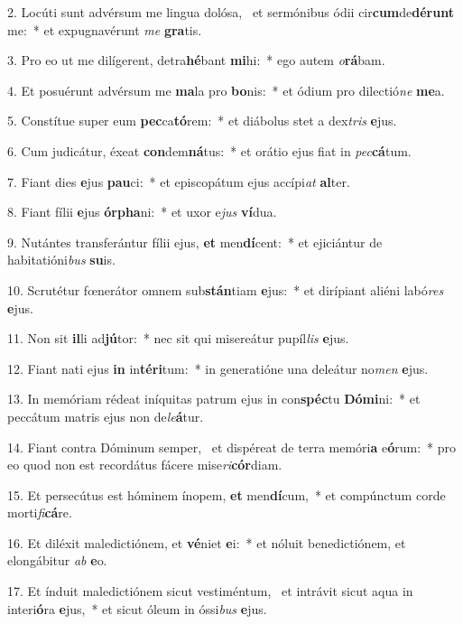 2. Locúti sunt advérsum me lingua dolósa, \dag\  et sermónibus ódii cir\textbf{cum}de\textbf{dé}\textbf{runt} me:~*  et expugnavérunt \textit{me} \textbf{gra}tis.\

3. Pro eo ut me dilígerent, detra\textbf{hé}bant \textbf{mi}hi:~*  ego autem \textit{o}\textbf{rá}bam.\

4. Et posuérunt advérsum me \textbf{ma}la pro \textbf{bo}nis:~*  et ódium pro dilectió\textit{ne} \textbf{me}a.\

5. Constítue super eum \textbf{pec}ca\textbf{tó}rem:~*  et diábolus stet a dex\textit{tris} \textbf{e}jus.\

6. Cum judicátur, éxeat \textbf{con}dem\textbf{ná}tus:~*  et orátio ejus fiat in \textit{pec}\textbf{cá}tum.\

7. Fiant dies \textbf{e}jus \textbf{pau}ci:~*  et episcopátum ejus accípi\textit{at} \textbf{al}ter.\

8. Fiant fílii \textbf{e}jus \textbf{ór}\textbf{pha}ni:~*  et uxor e\textit{jus} \textbf{ví}dua.\

9. Nutántes transferántur fílii ejus, \textbf{et} men\textbf{dí}cent:~*  et ejiciántur de habitatióni\textit{bus} \textbf{su}is.\

10. Scrutétur fœnerátor omnem sub\textbf{stán}tiam \textbf{e}jus:~*  et dirípiant aliéni labó\textit{res} \textbf{e}jus.\

11. Non sit \textbf{il}li ad\textbf{jú}tor:~*  nec sit qui misereátur pupíl\textit{lis} \textbf{e}jus.\

12. Fiant nati ejus \textbf{in} in\textbf{tér}\textbf{i}tum:~*  in generatióne una deleátur no\textit{men} \textbf{e}jus.\

13. In memóriam rédeat iníquitas patrum ejus in con\textbf{spéc}tu \textbf{Dó}\textbf{mi}ni:~*  et peccátum matris ejus non de\textit{le}\textbf{á}tur.\

14. Fiant contra Dóminum semper, \dag\  et dispéreat de terra memóri\textbf{a} e\textbf{ó}rum:~*  pro eo quod non est recordátus fácere mise\textit{ri}\textbf{cór}diam.\

15. Et persecútus est hóminem ínopem, \textbf{et} men\textbf{dí}cum,~*  et compúnctum corde morti\textit{fi}\textbf{cá}re.\

16. Et diléxit maledictiónem, et \textbf{vé}niet \textbf{e}i:~*  et nóluit benedictiónem, et elongábitur \textit{ab} \textbf{e}o.\

17. Et índuit maledictiónem sicut vestiméntum, \dag\  et intrávit sicut aqua in interi\textbf{ó}ra \textbf{e}jus,~*  et sicut óleum in óssi\textit{bus} \textbf{e}jus.\

